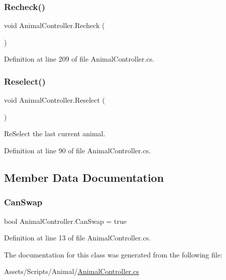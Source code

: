 \mbox{\label{class_animal_controller_a89f9677493d111f6edcd34a56e31fb3c}} 
\subsubsection{\texorpdfstring{Recheck()}{Recheck()}}
{\footnotesize\ttfamily void Animal\+Controller.\+Recheck (\begin{DoxyParamCaption}{ }\end{DoxyParamCaption})}



Definition at line 209 of file Animal\+Controller.\+cs.

\mbox{\label{class_animal_controller_a6951090bd26d6a25d3e9b62cc973a260}} 
\subsubsection{\texorpdfstring{Reselect()}{Reselect()}}
{\footnotesize\ttfamily void Animal\+Controller.\+Reselect (\begin{DoxyParamCaption}{ }\end{DoxyParamCaption})}



Re\+Select the last current animal. 



Definition at line 90 of file Animal\+Controller.\+cs.



\subsection{Member Data Documentation}
\mbox{\label{class_animal_controller_ac65849c961c72fad67bd561d6b974ccc}} 
\subsubsection{\texorpdfstring{Can\+Swap}{CanSwap}}
{\footnotesize\ttfamily bool Animal\+Controller.\+Can\+Swap = true}



Definition at line 13 of file Animal\+Controller.\+cs.



The documentation for this class was generated from the following file\+:\begin{DoxyCompactItemize}
\item 
Assets/\+Scripts/\+Animal/\mbox{\hyperlink{_animal_controller_8cs}{Animal\+Controller.\+cs}}\end{DoxyCompactItemize}
